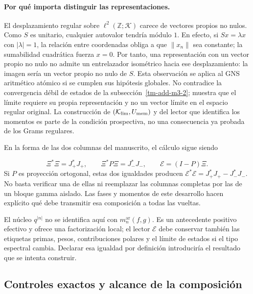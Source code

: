 \paragraph{Por qué importa distinguir las representaciones.}
El desplazamiento regular sobre \(\ell^2(\mathbb Z;\mathcal K)\)
carece de vectores propios no nulos. Como \(S\) es unitario, cualquier
autovalor tendría módulo \(1\). En efecto, si \(Sx=\lambda x\)
con \(|\lambda|=1\), la relación entre coordenadas obliga a que
\(\|x_n\|\) sea constante; la sumabilidad cuadrática fuerza \(x=0\).
Por tanto, una representación con un vector propio no nulo no admite
un entrelazador isométrico hacia ese desplazamiento: la imagen sería
un vector propio no nulo de \(S\). Esta observación se aplica al
GNS aritmético atómico si se cumplen sus hipótesis globales. No
contradice la convergencia débil de estados de la
subsección~\ref{tm-add-m3-2}; muestra que el límite requiere su propia
representación y no un vector límite en el espacio regular original.
La construcción de \((\mathcal K_{\rm lim},U_{\rm mem})\) y del
lector que identifica los momentos es parte de la condición prospectiva,
no una consecuencia ya probada de los Grams regulares.

En la forma de las dos columnas del manuscrito, el cálculo sigue siendo

\[
\Xi^*\Xi=J_+^*J_+,\qquad
\Xi^*P\Xi=J_-^*J_-,\qquad
\mathcal E=(I-P)\Xi.
\]
Si \(P\) es proyección ortogonal, estas dos igualdades producen \(\mathcal E^*\mathcal E=J_+^*J_+-J_-^*J_-\). No basta verificar una de ellas ni reemplazar las columnas completas por las de un bloque gamma aislado. Las fases y momentos de este desarrollo hacen explícito qué debe transmitir esa composición a todas las vueltas.

El núcleo \(q^{|n|}\) no se identifica aquí con \(m_n^{\mathrm{ar}}(f,g)\). Es un antecedente positivo efectivo y ofrece una factorización local; el lector \(\mathcal E\) debe conservar también las etiquetas primas, pesos, contribuciones polares y el límite de estados si el tipo espectral cambia. Declarar esa igualdad por definición introduciría el resultado que se intenta construir.


\subsection{Controles exactos y alcance de la composición}
\label{tm-add-m8}

